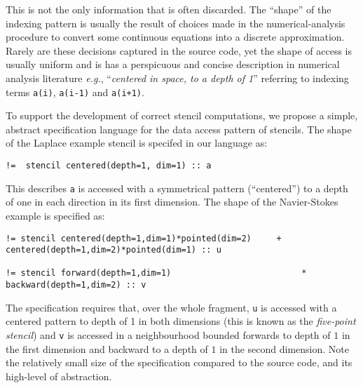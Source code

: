 \documentclass[10pt,preprint]{sigplanconf}
\theoremstyle{definition}
\newcommand{\eg}{\emph{e.g.}}
\begin{document}
This is not the only information that is often discarded. The
``shape'' of the indexing pattern is usually the result of choices made in the
numerical-analysis procedure to convert some
continuous equations into a discrete approximation. Rarely are these
decisions captured in the source code, yet the shape of access is
usually uniform and is has a perspicuous and concise description in
numerical analysis literature \eg{}, ``\emph{centered in space, to a
  depth of 1}'' referring to indexing terms \texttt{a(i)},
\texttt{a(i-1)} and \texttt{a(i+1)}.

To support the development of correct stencil computations, we propose
a simple, abstract specification language for the data access pattern
of stencils. The shape of the
Laplace example stencil is specifed in our language as:
%
\begin{verbatim}
!=  stencil centered(depth=1, dim=1) :: a
\end{verbatim}
%
This describes \texttt{a} is accessed with a symmetrical pattern
(``centered'') to a depth of one in each direction in its first
dimension.  The shape of the Navier-Stokes example
is specified as:
%
\begin{verbatim}
!= stencil centered(depth=1,dim=1)*pointed(dim=2)     + centered(depth=1,dim=2)*pointed(dim=1) :: u

!= stencil forward(depth=1,dim=1)                          * backward(depth=1,dim=2) :: v
\end{verbatim}
%
The specification requires that, over the whole fragment, \texttt{u}
is accessed with a centered pattern to depth of 1 in both dimensions
(this is known as the \emph{five-point stencil}) and \texttt{v} is
accessed in a neighbourhood bounded forwards to depth of $1$ in the
first dimension and backward to a depth of $1$ in the second
dimension. Note the relatively small size of the specification
compared to the source code, and its high-level of abstraction.
\end{document}
